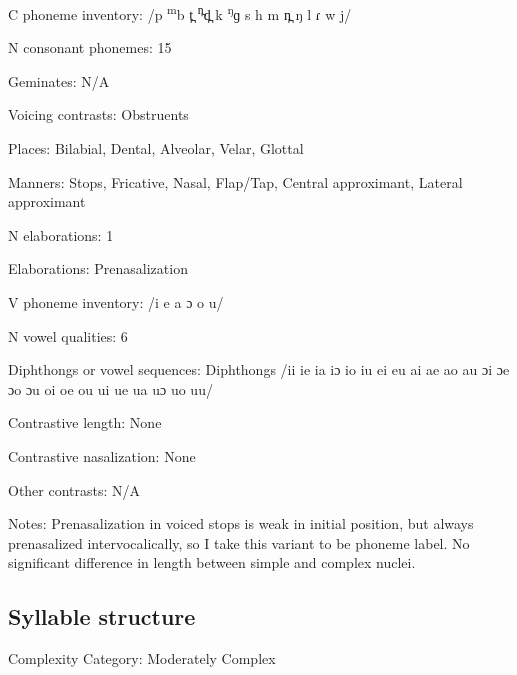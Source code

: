 {\begin{appendixdesc}
\item[C phoneme inventory:] /p \textsuperscript{m}b t̪ \textsuperscript{n̪}d̪ k \textsuperscript{ŋ}ɡ s h m n̪ ŋ l ɾ w j/

\item[N consonant phonemes:] 15

\item[Geminates:] N/A

\item[Voicing contrasts:] Obstruents

\item[Places:] Bilabial, Dental, Alveolar, Velar, Glottal

\item[Manners:] Stops, Fricative, Nasal, Flap/Tap, Central approximant, Lateral approximant

\item[N elaborations:] 1

\item[Elaborations:] Prenasalization

\item[V phoneme inventory:] /i e a ɔ o u/

\item[N vowel qualities:] 6

\item[Diphthongs or vowel sequences:] Diphthongs /ii ie ia iɔ io iu ei eu ai ae ao au ɔi ɔe ɔo ɔu oi oe ou ui ue ua uɔ uo uu/

\item[Contrastive length:] None

\item[Contrastive nasalization:] None

\item[Other contrasts:] N/A

\item[Notes:] Prenasalization in voiced stops is weak in initial position, but always prenasalized intervocalically, so I take this variant to be phoneme label. No significant difference in length between simple and complex nuclei.
\end{appendixdesc}
\subsection*{Syllable structure}
\begin{appendixdesc}

\item[Complexity Category:] Moderately Complex


\end{appendixdesc}}

